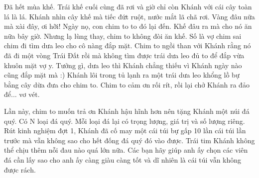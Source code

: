 Đã hết mùa khế. Trái khế cuối cùng đã rơi và giờ chỉ còn Khánh với cái cây toàn lá là lá. Khánh nhìn cây khế mà tiếc đứt ruột, nước mắt lã chã rơi. Vàng đâu nữa mà xài đây, ơi hỡi! Ngày nọ, con chim to to đó lại đến. Khế đâu ra mà cho nó ăn nữa bây giờ. Nhưng lạ lùng thay, chim to không đòi ăn khế. Số là vợ chim sai chim đi tìm dưa leo cho cô nàng đắp mặt. Chim to ngồi than với Khánh rằng nó đã đi một vòng Trái Đất rồi mà không tìm được trái dưa leo đủ to để đắp vừa khuôn mặt vợ y. Tưởng gì, dưa leo thì Khánh chẳng thiếu vì Khánh ngày nào cũng đắp mặt mà :) Khánh lôi trong tủ lạnh ra một trái dưa leo khổng lồ bự bằng cây dừa đưa cho chim to. Chim to cảm ơn rối rít, rồi lại chở Khánh ra đảo để... vơ vét.  

   Lần này, chim to muốn trả ơn Khánh hậu hĩnh hơn nên tặng Khánh một núi đá quý. Có N loại đá quý. Mỗi loại đá lại có trọng lượng, giá trị và số lượng riêng. Rút kinh nghiệm đợt 1, Khánh đã cố may một cái túi bự gấp 10 lần cái túi lần trước mà vẫn không sao cho hết đống đá quý đó vào được. Trái tim Khánh không thể chịu thêm nỗi đau nào quá lớn nữa. Các bạn hãy giúp anh ấy chọn các viên đá cần lấy sao cho anh ấy càng giàu càng tốt và dĩ nhiên là cái túi vẫn không được rách.